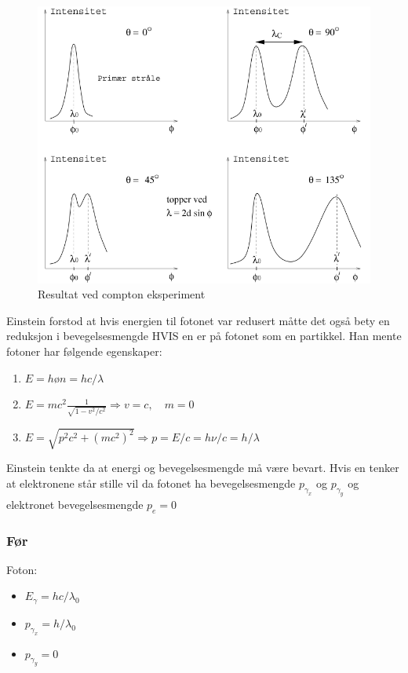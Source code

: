 \begin{figure}[h!]
  \centering
  \includegraphics[scale = .5]{Figures/Compton resultater.png}
  \caption{Resultat ved compton eksperiment}
  \label{fig: Compton resultater}
\end{figure}

Einstein forstod at hvis energien til fotonet var redusert måtte det også bety en reduksjon i bevegelsesmengde HVIS en er på fotonet som en partikkel. Han mente fotoner har følgende egenskaper: 
\begin{enumerate}
    \item $E = høn = h c / λ$
    \item $E = mc^2 \frac{1}{\sqrt{1 - v^{2} / c^{2}}} ⇒ v = c, \quad m = 0$
    \item $E = \sqrt{p^{2} c^{2} +(mc^{2})^{2}} ⇒ p = E /c = hν / c = h /λ$
\end{enumerate}
Einstein tenkte da at energi og bevegelsesmengde må være bevart. Hvis en tenker at elektronene står stille vil da fotonet ha bevegelsesmengde $p_{γ_{x}}$ og $p_{γ_{y}}$ og elektronet bevegelsesmengde $p_{e} = 0$ 




\subsubsection*{Før}
Foton: 
\begin{itemize}
    \item $E_{γ} = h c / λ_0$
    \item $p_{γ_{x}} = h / λ_0$
    \item $p_{γ_{y}} = 0$  
\end{itemize}

